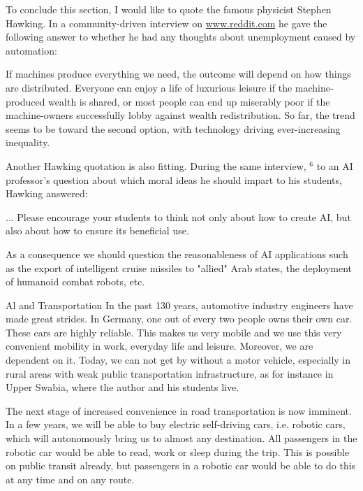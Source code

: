 \documentclass[10pt]{book}
\begin{document}
To conclude this section, I would like to quote the famous physicist Stephen Hawking. In a community-driven interview on \href{http://www.reddit.com}{www.reddit.com} he gave the following answer to whether he had any thoughts about unemployment caused by automation:

\begin{displayquote}
If machines produce everything we need, the outcome will depend on how things are distributed. Everyone can enjoy a life of luxurious leisure if the machine-produced wealth is shared, or most people can end up miserably poor if the machine-owners successfully lobby against wealth redistribution. So far, the trend seems to be toward the second option, with technology driving ever-increasing inequality.
\end{displayquote}

Another Hawking quotation is also fitting. During the same interview, ${ }^{6}$ to an AI professor's question about which moral ideas he should impart to his students, Hawking answered:

\begin{displayquote}
... Please encourage your students to think not only about how to create AI, but also about how to ensure its beneficial use.
\end{displayquote}

As a consequence we should question the reasonableness of AI applications such as the export of intelligent cruise missiles to "allied" Arab states, the deployment of humanoid combat robots, etc.

Al and Transportation
In the past 130 years, automotive industry engineers have made great strides. In Germany, one out of every two people owns their own car. These cars are highly reliable. This makes us very mobile and we use this very convenient mobility in work, everyday life and leisure. Moreover, we are dependent on it. Today, we can not get by without a motor vehicle, especially in rural areas with weak public transportation infrastructure, as for instance in Upper Swabia, where the author and his students live.

The next stage of increased convenience in road transportation is now imminent. In a few years, we will be able to buy electric self-driving cars, i.e. robotic cars, which will autonomously bring us to almost any destination. All passengers in the robotic car would be able to read, work or sleep during the trip. This is possible on public transit already, but passengers in a robotic car would be able to do this at any time and on any route.
\end{document}
